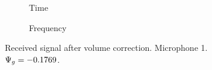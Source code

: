 \begin{figure}[h]
	\centering
	\begin{subfigure}[b]{0.49\textwidth}
		\def\svgwidth{0.9\columnwidth}
		\graphicspath{{Img/}}
		{\fontsize{5}{12}\selectfont
			
		}
		\caption{Time}
	\end{subfigure}
	\begin{subfigure}[b]{0.49\textwidth}
		\def\svgwidth{0.9\columnwidth}
		\graphicspath{{Img/}}
		{\fontsize{5}{12}\selectfont
			
		}
	\caption{Frequency}	
	\end{subfigure}
\caption{Received signal after volume correction. Microphone 1. $\Psi_g = -0.1769$.}
	\label{corrVol}
\end{figure}